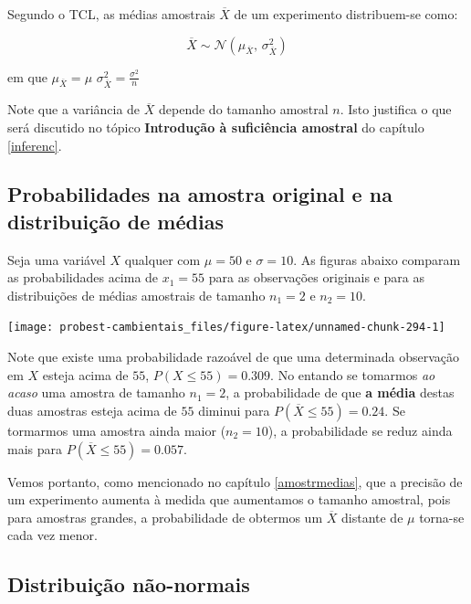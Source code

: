 \documentclass[
]{book}
\begin{document}
Segundo o TCL, as médias amostrais \(\overline{X}\) de um experimento distribuem-se como:

\[\overline{X} \sim \mathcal{N}(\mu_{\overline{X}},\,\sigma^{2}_{\overline{X}})\]

em que \(\mu_{\overline{X}} = \mu\) \(\sigma^{2}_{\overline{X}} = \frac{\sigma^2}{n}\)

Note que a variância de \(\overline{X}\) depende do tamanho amostral \(n\). Isto justifica o que será discutido no tópico \textbf{Introdução à suficiência amostral} do capítulo \ref{inferenc}.

\hypertarget{probabilidades-na-amostra-original-e-na-distribuiuxe7uxe3o-de-muxe9dias}{%
\subsection{Probabilidades na amostra original e na distribuição de médias}\label{probabilidades-na-amostra-original-e-na-distribuiuxe7uxe3o-de-muxe9dias}}

Seja uma variável \(X\) qualquer com \(\mu = 50\) e \(\sigma = 10\). As figuras abaixo comparam as probabilidades acima de \(x_1 = 55\) para as observações originais e para as distribuições de médias amostrais de tamanho \(n_1 = 2\) e \(n_2 = 10\).

\begin{center}\texttt{[image: probest-cambientais\_files/figure-latex/unnamed-chunk-294-1]} \end{center}

Note que existe uma probabilidade razoável de que uma determinada observação em \(X\) esteja acima de \(55\), \(P(X \leq 55) = 0.309\). No entando se tomarmos \emph{ao acaso} uma amostra de tamanho \(n_1 = 2\), a probabilidade de que \textbf{a média} destas duas amostras esteja acima de \(55\) diminui para \(P(\overline{X} \leq 55) = 0.24\). Se tormarmos uma amostra ainda maior (\(n_2 = 10\)), a probabilidade se reduz ainda mais para \(P(\overline{X} \leq 55) = 0.057\).

Vemos portanto, como mencionado no capítulo \ref{amostrmedias}, que a precisão de um experimento aumenta à medida que aumentamos o tamanho amostral, pois para amostras grandes, a probabilidade de obtermos um \(\overline{X}\) distante de \(\mu\) torna-se cada vez menor.

\hypertarget{distribuiuxe7uxe3o-nuxe3o-normais}{%
\subsection{Distribuição não-normais}\label{distribuiuxe7uxe3o-nuxe3o-normais}}
\end{document}
